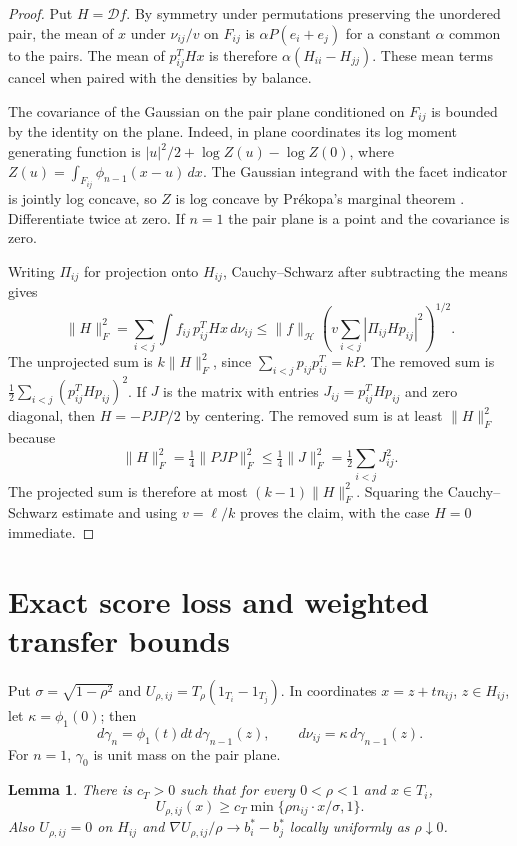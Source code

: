 \documentclass[11pt,reqno]{amsart}
\newtheorem{lemma}[theorem]{Lemma}
\newcommand{\norm}[1]{\lVert #1\rVert}
\newcommand{\ga}{\gamma}
\newcommand{\HH}{\mathcal H}
\newcommand{\DD}{\mathcal D}
\begin{document}
\begin{proof}
Put $H=\DD f$. By symmetry under permutations preserving the unordered
pair, the mean of $x$ under $\nu_{ij}/v$ on $F_{ij}$ is
$\alpha P(e_i+e_j)$ for a constant $\alpha$ common to the pairs. The
mean of $p_{ij}^THx$ is therefore $\alpha(H_{ii}-H_{jj})$. These mean
terms cancel when paired with the densities by balance.

The covariance of the Gaussian on the pair plane conditioned on
$F_{ij}$ is bounded by the identity on the plane. Indeed, in plane
coordinates its log moment generating function is
$|u|^2/2+\log Z(u)-\log Z(0)$, where
$Z(u)=\int_{F_{ij}}\phi_{n-1}(x-u)\,dx$. The Gaussian integrand with
the facet indicator is jointly log concave, so $Z$ is log concave by
Prékopa's marginal theorem \cite[Theorem~6]{Prekopa}. Differentiate
twice at zero. If $n=1$ the pair plane is a point and the covariance
is zero.

Writing $\Pi_{ij}$ for projection onto $H_{ij}$, Cauchy--Schwarz after
subtracting the means gives
\[
 \norm H_F^2=\sum_{i<j}\int f_{ij}\,p_{ij}^{T}Hx\,d\nu_{ij}
 \le \norm f_\HH
      \left(v\sum_{i<j}|\Pi_{ij}Hp_{ij}|^2\right)^{1/2}.
\]
The unprojected sum is $k\norm H_F^2$, since
$\sum_{i<j}p_{ij}p_{ij}^T=kP$. The removed sum is
$\tfrac12\sum_{i<j}(p_{ij}^THp_{ij})^2$. If $J$ is the matrix with
entries $J_{ij}=p_{ij}^THp_{ij}$ and zero diagonal, then
$H=-PJP/2$ by centering. The removed sum is at least $\norm H_F^2$
because
\[
 \norm H_F^2=\tfrac14\norm{PJP}_F^2\le\tfrac14\norm J_F^2
             =\tfrac12\sum_{i<j}J_{ij}^2 .
\]
The projected sum is therefore at most $(k-1)\norm H_F^2$. Squaring
the Cauchy--Schwarz estimate and using $v=\ell/k$ proves the claim,
with the case $H=0$ immediate.
\end{proof}

\section{Exact score loss and weighted transfer bounds}\label{sec:tails}

Put $\sigma=\sqrt{1-\rho^2}$ and
$U_{\rho,ij}=T_\rho(1_{T_i}-1_{T_j})$. In coordinates
$x=z+tn_{ij}$, $z\in H_{ij}$, let $\kappa=\phi_1(0)$; then
\[
 d\ga_n=\phi_1(t)dt\,d\ga_{n-1}(z),\qquad
 d\nu_{ij}=\kappa\,d\ga_{n-1}(z).
\]
For $n=1$, $\ga_0$ is unit mass on the pair plane.

\begin{lemma}\label{lem:margin}
There is $c_T>0$ such that for every $0<\rho<1$ and $x\in T_i$,
\begin{equation}\label{eq:saturated-margin}
 U_{\rho,ij}(x)\ge c_T\min\{\rho n_{ij}\cdot x/\sigma,1\}.
\end{equation}
Also $U_{\rho,ij}=0$ on $H_{ij}$ and
$\nabla U_{\rho,ij}/\rho\to b_i^*-b_j^*$ locally uniformly as
$\rho\downarrow0$.
\end{lemma}
\end{document}
